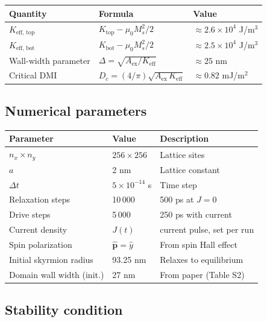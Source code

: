 \documentclass[11pt,a4paper]{article}
\newcommand{\mb}[1]{\mathbf{#1}}
\newcommand{\phat}{\hat{\mb{p}}}
\newcommand{\Keff}{K_{\text{eff}}}
\newcommand{\Aex}{A_{\text{ex}}}
\newcommand{\Ms}{M_s}
\begin{document}
\begin{table}[H]
\centering
\begin{tabular}{@{}lll@{}}
\toprule
Quantity & Formula & Value \\
\midrule
$K_{\text{eff, top}}$
    & $K_{\text{top}} - \mu_0 \Ms^2 / 2$
    & $\approx 2.6 \times 10^4$ J/m$^3$ \\
$K_{\text{eff, bot}}$
    & $K_{\text{bot}} - \mu_0 \Ms^2 / 2$
    & $\approx 2.5 \times 10^4$ J/m$^3$ \\
Wall-width parameter
    & $\Delta = \sqrt{\Aex / \Keff}$
    & $\approx 25$ nm \\
Critical DMI
    & $D_c = (4/\pi)\sqrt{\Aex\,\Keff}$
    & $\approx 0.82$ mJ/m$^2$ \\
\bottomrule
\end{tabular}
\end{table}

\subsection*{Numerical parameters}

\begin{table}[H]
\centering
\begin{tabular}{@{}lll@{}}
\toprule
Parameter & Value & Description \\
\midrule
$n_x \times n_y$ & $256 \times 256$ & Lattice sites \\
$a$ & 2 nm & Lattice constant \\
$\Delta t$ & $5 \times 10^{-14}$ s & Time step \\
Relaxation steps & 10\,000 & 500 ps at $J = 0$ \\
Drive steps & 5\,000 & 250 ps with current \\
Current density & $J(t)$ & current pulse, set per run \\
Spin polarization & $\phat = \hat{y}$
    & From spin Hall effect \\
Initial skyrmion radius & 93.25 nm
    & Relaxes to equilibrium \\
Domain wall width (init.) & 27 nm
    & From paper (Table S2) \\
\bottomrule
\end{tabular}
\end{table}

\subsection*{Stability condition}
\end{document}
